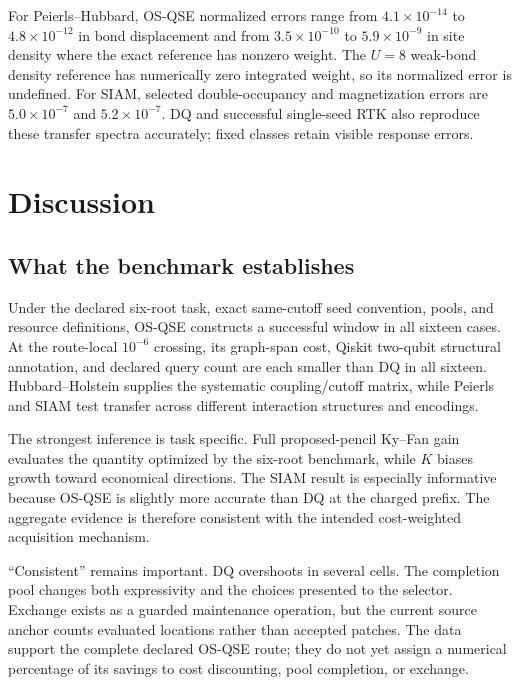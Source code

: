 \documentclass[
  reprint,
  amsmath,
  amssymb,
  aps,
  pra,
  nofootinbib,
  superscriptaddress,
  floatfix
]{revtex4-2}
\begin{document}
For Peierls--Hubbard, OS-QSE normalized errors range from
$4.1\times10^{-14}$ to $4.8\times10^{-12}$ in bond displacement and from
$3.5\times10^{-10}$ to $5.9\times10^{-9}$ in site density where the exact
reference has nonzero weight.  The $U=8$ weak-bond density reference has
numerically zero integrated weight, so its normalized error is undefined.
For SIAM, selected double-occupancy and magnetization errors are
$5.0\times10^{-7}$ and $5.2\times10^{-7}$.  DQ and successful single-seed
RTK also reproduce these transfer spectra accurately; fixed classes retain
visible response errors.

\section{Discussion}
\label{sec:discussion}

\subsection{What the benchmark establishes}

Under the declared six-root task, exact same-cutoff seed convention, pools,
and resource definitions, OS-QSE constructs a successful window in all
sixteen cases.  At the route-local $10^{-6}$ crossing, its graph-span cost,
Qiskit two-qubit structural annotation, and declared query count are each
smaller than DQ in all sixteen.  Hubbard--Holstein supplies the systematic
coupling/cutoff matrix, while Peierls and SIAM test transfer across different
interaction structures and encodings.

The strongest inference is task specific.  Full proposed-pencil Ky--Fan gain
evaluates the quantity optimized by the six-root benchmark, while $K$ biases
growth toward economical directions.  The SIAM result is especially
informative because OS-QSE is slightly more accurate than DQ at the charged
prefix.  The aggregate evidence is therefore consistent with the intended
cost-weighted acquisition mechanism.

``Consistent'' remains important.  DQ overshoots in several cells.  The
completion pool changes both expressivity and the choices presented to the
selector.  Exchange exists as a guarded maintenance operation, but the
current source anchor counts evaluated locations rather than accepted
patches.  The data support the complete declared OS-QSE route; they do not
yet assign a numerical percentage of its savings to cost discounting, pool
completion, or exchange.
\end{document}
